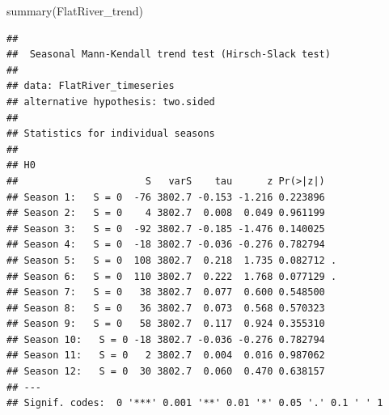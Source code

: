 \documentclass[
  12pt,
]{article}
\newenvironment{Shaded}{\begin{snugshade}}{\end{snugshade}}
\newcommand{\AttributeTok}[1]{\textcolor[rgb]{0.77,0.63,0.00}{#1}}
\newcommand{\CommentTok}[1]{\textcolor[rgb]{0.56,0.35,0.01}{\textit{#1}}}
\newcommand{\DecValTok}[1]{\textcolor[rgb]{0.00,0.00,0.81}{#1}}
\newcommand{\FunctionTok}[1]{\textcolor[rgb]{0.00,0.00,0.00}{#1}}
\newcommand{\NormalTok}[1]{#1}
\newcommand{\OtherTok}[1]{\textcolor[rgb]{0.56,0.35,0.01}{#1}}
\newcommand{\SpecialCharTok}[1]{\textcolor[rgb]{0.00,0.00,0.00}{#1}}
\newcommand{\StringTok}[1]{\textcolor[rgb]{0.31,0.60,0.02}{#1}}
\begin{document}
\begin{Shaded}
\begin{Highlighting}[]
\FunctionTok{summary}\NormalTok{(FlatRiver\_trend)}
\end{Highlighting}
\end{Shaded}

\begin{verbatim}
## 
##  Seasonal Mann-Kendall trend test (Hirsch-Slack test)
## 
## data: FlatRiver_timeseries
## alternative hypothesis: two.sided
## 
## Statistics for individual seasons
## 
## H0
##                      S   varS    tau      z Pr(>|z|)  
## Season 1:   S = 0  -76 3802.7 -0.153 -1.216 0.223896  
## Season 2:   S = 0    4 3802.7  0.008  0.049 0.961199  
## Season 3:   S = 0  -92 3802.7 -0.185 -1.476 0.140025  
## Season 4:   S = 0  -18 3802.7 -0.036 -0.276 0.782794  
## Season 5:   S = 0  108 3802.7  0.218  1.735 0.082712 .
## Season 6:   S = 0  110 3802.7  0.222  1.768 0.077129 .
## Season 7:   S = 0   38 3802.7  0.077  0.600 0.548500  
## Season 8:   S = 0   36 3802.7  0.073  0.568 0.570323  
## Season 9:   S = 0   58 3802.7  0.117  0.924 0.355310  
## Season 10:   S = 0 -18 3802.7 -0.036 -0.276 0.782794  
## Season 11:   S = 0   2 3802.7  0.004  0.016 0.987062  
## Season 12:   S = 0  30 3802.7  0.060  0.470 0.638157  
## ---
## Signif. codes:  0 '***' 0.001 '**' 0.01 '*' 0.05 '.' 0.1 ' ' 1
\end{verbatim}

\begin{Shaded}
\end{Shaded}
\end{document}
